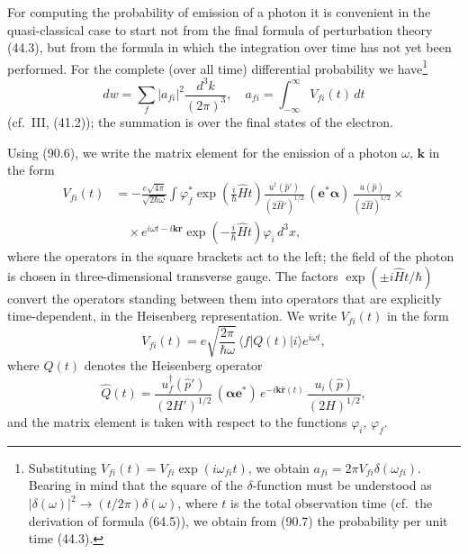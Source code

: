 
For computing the probability of emission of a photon it is convenient in the quasi-classical case to start not from the final formula of perturbation theory (44.3), but from the formula in which the integration over time has not yet been performed. For the complete (over all time) differential probability we have\footnote{Substituting
$V_{fi}(t) = V_{fi}\exp(i\omega_{fi}t)$,
we obtain $a_{fi} = 2\pi V_{fi}\delta(\omega_{fi})$. Bearing in mind that the square of the $\delta$-function must be understood as
$|\delta(\omega)|^2 \to (t/2\pi)\delta(\omega)$,
where $t$ is the total observation time (cf.\ the derivation of formula (64.5)), we obtain from (90.7) the probability per unit time (44.3).}
\begin{equation}
dw = \sum_f |a_{fi}|^2\frac{d^3k}{(2\pi)^3}, \quad a_{fi} = \int_{-\infty}^{\infty} V_{fi}(t)\,dt
\label{eq:90.7}
\end{equation}
(cf.\ III, (41.2)); the summation is over the final states of the electron.

Using (90.6), we write the matrix element for the emission of a photon $\omega$, $\mathbf{k}$ in the form
\begin{align*}
V_{fi}(t) &= -\frac{e\sqrt{4\pi}}{\sqrt{2\hbar\omega}}\int \varphi_f^*\exp\!\left(\frac{i}{\hbar}\hat{H}t\right)\frac{u^\dagger(\hat{p}')}{(2\hat{H}')^{1/2}}\,(\mathbf{e}^*\boldsymbol{\alpha})\,\frac{u(\hat{p})}{(2\hat{H})^{1/2}} \times {} \\
&\quad \times e^{i\omega t - i\mathbf{kr}}\exp\!\left(-\frac{i}{\hbar}\hat{H}t\right)\varphi_i\,d^3x,
\end{align*}
where the operators in the square brackets act to the left; the field of the photon is chosen in three-dimensional transverse gauge. The factors $\exp(\pm i\hat{H}t/\hbar)$ convert the operators standing between them into operators that are explicitly time-dependent, in the Heisenberg representation. We write $V_{fi}(t)$ in the form
\begin{equation}
V_{fi}(t) = e\sqrt{\frac{2\pi}{\hbar\omega}}\,\langle f|Q(t)|i\rangle e^{i\omega t},
\label{eq:90.8}
\end{equation}
where $Q(t)$ denotes the Heisenberg operator
\begin{equation}
\hat{Q}(t) = \frac{u_f^\dagger(\hat{p}')}{(2H')^{1/2}}\,(\boldsymbol{\alpha}\mathbf{e}^*)\,e^{-i\mathbf{k}\hat{\mathbf{r}}(t)}\,\frac{u_i(\hat{p})}{(2H)^{1/2}},
\label{eq:90.9}
\end{equation}
and the matrix element is taken with respect to the functions $\varphi_i$, $\varphi_f$.

